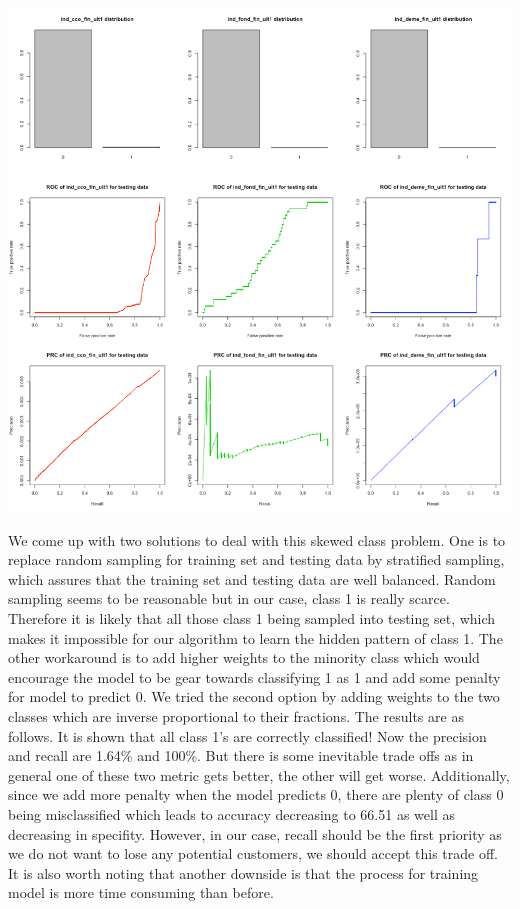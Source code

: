 \documentclass{article}
\begin{document}
\begin{spacing}{1}
\begin{large}
\vspace{5mm}
\includegraphics[scale = 0.8]{ROCandPR.png}
\vspace{5mm}

We come up with two solutions to deal with this skewed class problem. One is to replace random sampling for training set and testing data by stratified sampling, which assures that the training set and testing data are well balanced. Random sampling seems to be reasonable but in our case, class 1 is really scarce. Therefore it is likely that all those class 1 being sampled into testing set, which makes it impossible for our algorithm to learn the hidden pattern of class 1. The other workaround is to add higher weights to the minority class which would encourage the model to be gear towards classifying 1 as 1 and add some penalty for model to predict 0. We tried the second option by adding weights to the two classes which are inverse proportional to their fractions. The results are as follows. It is shown that all class 1’s are correctly classified! Now the precision and recall are 1.64\% and 100\%. But there is some inevitable trade offs as in general one of these two metric gets better, the other will get worse. Additionally, since we add more penalty when the model predicts 0, there are plenty of class 0 being misclassified which leads to accuracy decreasing to 66.51 as well as decreasing in specifity. However, in our case, recall should be the first priority as we do not want to lose any potential customers, we should accept this trade off. It is also worth noting that another downside is that the process for training model is more time consuming than before.


\end{large}
\end{spacing}
\end{document}
